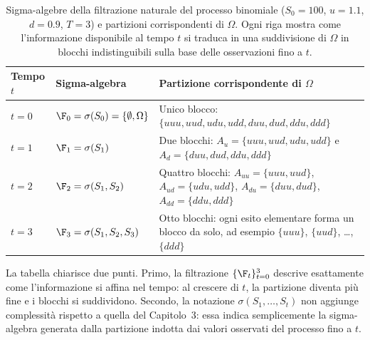 \begin{table}[h]
\centering
\begin{tabular}{|p{1.2cm}|p{3.5 cm}|p{6.0cm}|}
\hline
\textbf{Tempo} $t$ & \textbf{Sigma-algebra} & \textbf{Partizione
corrispondente di $\Omega$}\\
\hline
$t=0$ & $\F_0=\sigma(S_0)=\{\emptyset,\Omega\}$ &
Unico blocco: \newline $\{uuu,uud,udu,udd,duu,dud,ddu,ddd\}$\\
\hline
$t=1$ & $\F_1=\sigma(S_1)$ &
Due blocchi: \newline $A_u=\{uuu,uud,udu,udd\}$ e \newline
$A_d=\{duu,dud,ddu,ddd\}$\\
\hline
$t=2$ & $\F_2=\sigma(S_1,S_2)$ &
Quattro blocchi: $A_{uu}=\{uuu,uud\}$,
$A_{ud}=\{udu,udd\}$,
$A_{du}=\{duu,dud\}$,
$A_{dd}=\{ddu,ddd\}$\\
\hline
$t=3$ & $\F_3=\sigma(S_1,S_2,S_3)$ &
Otto blocchi: ogni esito elementare forma un blocco
da solo, ad esempio $\{uuu\}$, $\{uud\}$, \ldots,
$\{ddd\}$\\
\hline
\end{tabular}
\caption{Sigma-algebre della filtrazione naturale del processo
binomiale ($S_0=100$, $u=1.1$, $d=0.9$, $T=3$) e partizioni
corrispondenti di $\Omega$. Ogni riga mostra come l'informazione
disponibile al tempo $t$ si traduca in una suddivisione di
$\Omega$ in blocchi indistinguibili sulla base delle osservazioni
fino a $t$.}
\label{tab:sigma-partizione}
\end{table}

\noindent
La tabella chiarisce due punti. Primo, la filtrazione
$\{\F_t\}_{t=0}^{3}$ descrive esattamente come l'informazione
si affina nel tempo: al crescere di $t$, la partizione diventa
pi\`{u} fine e i blocchi si suddividono. Secondo, la notazione
$\sigma(S_1,\ldots,S_t)$ non aggiunge complessit\`{a} rispetto
a quella del Capitolo~3: essa indica semplicemente la
sigma-algebra generata dalla partizione indotta dai valori
osservati del processo fino a $t$.


